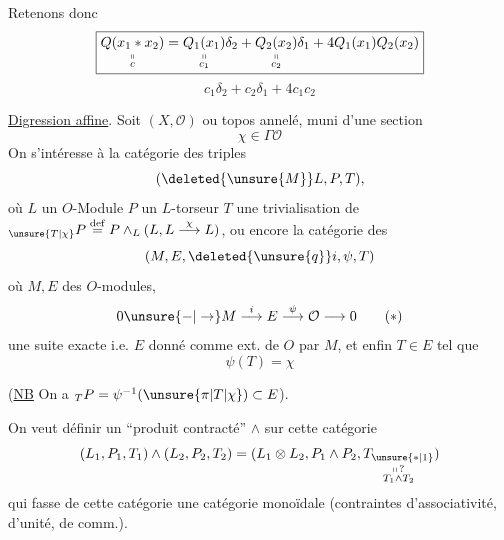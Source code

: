 
Retenons donc
\[
\boxed{\underset{\substack{\shortparallel\\c}}{Q(x_1*x_2)}=\underset{\substack{\shortparallel\\c_1}}{Q_1(x_1)}\delta_2+\underset{\substack{\shortparallel\\c_2}}{Q_2(x_2)}\delta_1+4Q_1(x_1)Q_2(x_2)}
\]
\[
c_1\delta_2+c_2\delta_1+4c_1c_2
\]

\uline{Digression affine}.
Soit $(X,\mathcal O)$  ou topos annelé, muni d'une section
\[
\chi\in\Gamma\mathcal O
\]
On s'intéresse à la catégorie des triples
\[
(\deleted{\unsure{M}}L,P,T),
\]
où \quad $L$ un $O$-Module \quad $P$ un $L$-torseur \quad $T$ une trivialisation de ${}_{\unsure{T|\chi}}P\overset{\mathrm{def}}=P\wedge_L(L,L\overset{\chi}{\longrightarrow}L)$,
ou encore la catégorie des  
\[
(M,E,\deleted{\unsure{q}}i,\psi,T)
\]
où $M,E$ des $O$-modules,
\[
0\unsure{\mathbin{-}|\to}M\overset{i}{\longrightarrow}E\overset{\psi}{\longrightarrow}\mathcal O\longrightarrow0\tag*{($*$)}
\]
une suite exacte i.e. $E$   donné comme ext. de $O$ par $M$, et enfin $T\in E$ tel que
\[
\psi(T)=\chi
\]

(\uline{NB} On a ${}_{T}P=\psi^{-1}(\unsure{\pi|T|\chi})\subset E$).

On veut définir un ``produit contracté'' $\wedge$ sur cette catégorie
\[
(L_1,P_1,T_1)\wedge(L_2,P_2,T_2)=(L_1\otimes L_2,P_1\wedge P_2,\underset{\substack{\shortparallel\,?\\T_1\wedge T_2}}{T_{\unsure{*|1}}})
\]
qui fasse de cette catégorie une  catégorie monoïdale (contraintes d'associativité, d'unité, de comm.).
